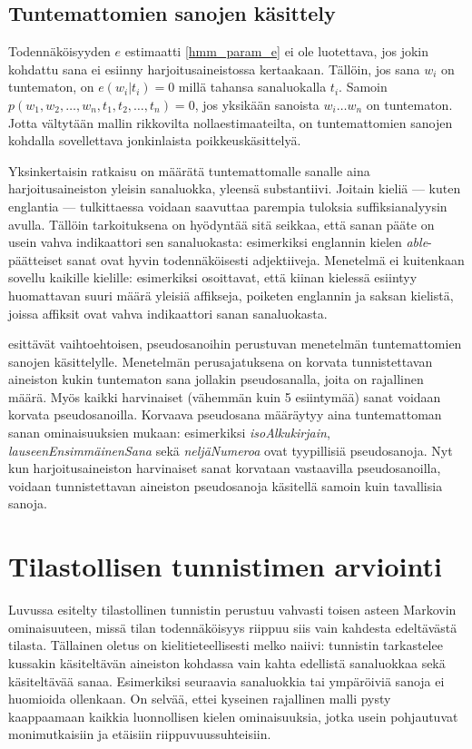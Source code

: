 \documentclass[utf8,bachelor,manualbib]{gradu3}
\begin{document}
\subsection{Tuntemattomien sanojen käsittely}

Todennäköisyyden $e$ estimaatti \eqref{hmm_param_e} ei ole luotettava, jos jokin kohdattu sana ei esiinny harjoitusaineistossa kertaakaan. Tällöin, jos sana $w_i$ on tuntematon, on $e(w_i|t_i)=0$ millä tahansa sanaluokalla $t_i$. Samoin $p(w_1, w_2, \ldots, w_n, t_1, t_2, \ldots, t_n) = 0$, jos yksikään sanoista $w_i \ldots w_n$ on tuntematon. Jotta vältytään mallin rikkovilta nollaestimaateilta, on tuntemattomien sanojen kohdalla sovellettava jonkinlaista poikkeuskäsittelyä.

Yksinkertaisin ratkaisu on määrätä tuntemattomalle sanalle aina harjoitusaineiston yleisin sanaluokka, yleensä substantiivi. Joitain kieliä --- kuten englantia --- tulkittaessa voidaan saavuttaa parempia tuloksia suffiksianalyysin \citep{samuelsson1993} avulla. Tällöin tarkoituksena on hyödyntää sitä seikkaa, että sanan pääte on usein vahva indikaattori sen sanaluokasta: esimerkiksi englannin kielen \emph{able}-päätteiset sanat ovat hyvin todennäköisesti adjektiiveja. Menetelmä ei kuitenkaan sovellu kaikille kielille: esimerkiksi \citet{tseng2005} osoittavat, että kiinan kielessä esiintyy huomattavan suuri määrä yleisiä affikseja, poiketen englannin ja saksan kielistä, joissa affiksit ovat vahva indikaattori sanan sanaluokasta.

\citet{bikel1999} esittävät vaihtoehtoisen, pseudosanoihin perustuvan menetelmän tuntemattomien sanojen käsittelylle. Menetelmän perusajatuksena on korvata tunnistettavan aineiston kukin tuntematon sana jollakin pseudosanalla, joita on rajallinen määrä. Myös kaikki harvinaiset (vähemmän kuin 5 esiintymää) sanat voidaan korvata pseudosanoilla. Korvaava pseudosana määräytyy aina tuntemattoman sanan ominaisuuksien mukaan: esimerkiksi \textit{isoAlkukirjain}, \textit{lauseenEnsimmäinenSana} sekä \textit{neljäNumeroa} ovat tyypillisiä pseudosanoja. Nyt kun harjoitusaineiston harvinaiset sanat korvataan vastaavilla pseudosanoilla, voidaan tunnistettavan aineiston pseudosanoja käsitellä samoin kuin tavallisia sanoja.

\section{Tilastollisen tunnistimen arviointi}

Luvussa esitelty tilastollinen tunnistin perustuu vahvasti toisen asteen Markovin ominaisuuteen, missä tilan todennäköisyys riippuu siis vain kahdesta edeltävästä tilasta. Tällainen oletus on kielitieteellisesti melko naiivi: tunnistin tarkastelee kussakin käsiteltävän aineiston kohdassa vain kahta edellistä sanaluokkaa sekä käsiteltävää sanaa. Esimerkiksi seuraavia sanaluokkia tai ympäröiviä sanoja ei huomioida ollenkaan. On selvää, ettei kyseinen rajallinen malli pysty kaappaamaan kaikkia luonnollisen kielen ominaisuuksia, jotka usein pohjautuvat monimutkaisiin ja etäisiin riippuvuussuhteisiin.
\end{document}
